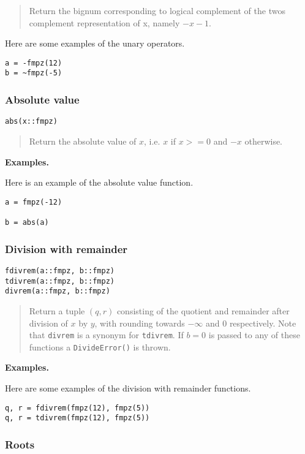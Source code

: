 \documentclass[a4paper,10pt]{article}
\newcommand{\code}{\lstinline}
\newcommand{\desc}[1]{\vspace{-3mm}\begin{quote}#1\end{quote}}
\begin{document}
{{\desc{Return the bignum corresponding to logical complement of the twos 
complement representation of x, namely $-x - 1$.}

Here are some examples of the unary operators.

\begin{lstlisting}
a = -fmpz(12)
b = ~fmpz(-5)
\end{lstlisting}

\subsubsection{Absolute value}

\begin{lstlisting}
abs(x::fmpz)
\end{lstlisting}

\desc{Return the absolute value of $x$, i.e. $x$ if $x >= 0$ and $-x$ otherwise.}

\textbf{Examples.}

Here is an example of the absolute value function.

\begin{lstlisting}
a = fmpz(-12)

b = abs(a)
\end{lstlisting}

\subsubsection{Division with remainder}

\begin{lstlisting}
fdivrem(a::fmpz, b::fmpz)
tdivrem(a::fmpz, b::fmpz)
divrem(a::fmpz, b::fmpz)
\end{lstlisting}

\desc{Return a tuple $(q, r)$ consisting of the quotient and remainder after 
division of $x$ by $y$, with rounding towards $-\infty$ and $0$ respectively. Note 
that \code{divrem} is a synonym for \code{tdivrem}. If $b = 0$ is passed to any
of these functions a \code{DivideError()} is thrown.}

\textbf{Examples.}

Here are some examples of the division with remainder functions.

\begin{lstlisting}
q, r = fdivrem(fmpz(12), fmpz(5))
q, r = tdivrem(fmpz(12), fmpz(5))
\end{lstlisting}

\subsubsection{Roots}

}}
\end{document}
